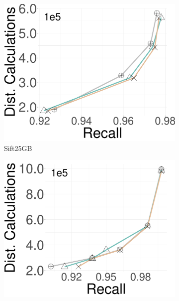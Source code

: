 \begin{figure}[ht]
          \begin{subfigure}[b]{0.28\textwidth}
              \captionsetup{justification=centering}
	\centering	
        \includegraphics[width=\textwidth]{../img/oigas/SWB/search/25GB/sift_DC.pdf}
        \caption{Sift25GB}
        \label{fig:SWBsearch:_Time}
    \end{subfigure}
    \hspace{0.4cm}
            \begin{subfigure}[b]{0.28\textwidth}
                \captionsetup{justification=centering}
	\centering	
                \includegraphics[width=\textwidth]{../img/oigas/SWB/search/100GB/sift_DC.pdf}

\end{subfigure}
\end{figure}
